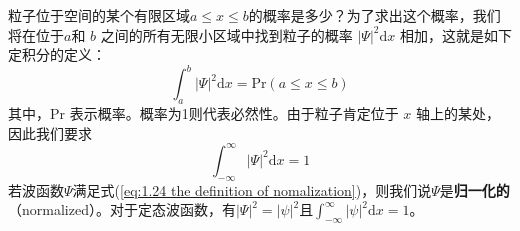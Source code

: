 	粒子位于空间的某个有限区域$a \le x \le b$的概率是多少？为了求出这个概率，我们将在位于$a$和 $b$ 之间的所有无限小区域中找到粒子的概率 $\left|\Psi\right|^2\mathrm{d}x$ 相加，这就是如下定积分的定义：
	\begin{equation}
		\boxed{\int_{a}^{b}\left|\Psi\right|^2 \mathrm{d}x = \text{Pr}\left(a \le x \le b\right)}
		\label{eq:1.23 int of probability}
	\end{equation}
	其中，Pr 表示概率。概率为1则代表必然性。由于粒子肯定位于 $x$ 轴上的某处，因此我们要求
	\begin{equation}
		\boxed{\int_{-\infty}^{\infty} \left|\Psi\right|^2 \mathrm{d}x = 1}
		\label{eq:1.24 the definition of nomalization}
	\end{equation}
	若波函数$\Psi$满足式(\ref{eq:1.24 the definition of nomalization})，则我们说$\Psi$是\textbf{归一化的}（normalized）。对于定态波函数，有$\left|\Psi\right|^2 = \left|\psi\right|^2$且$\int_{-\infty}^{\infty} \left|\psi\right|^2 \mathrm{d}x = 1$。
